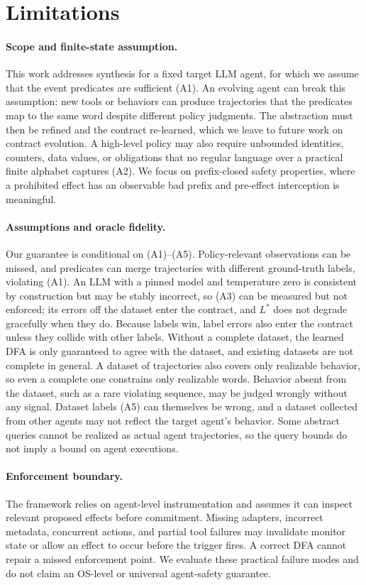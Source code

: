 \section{Limitations}\label{sec:limitations}
\paragraph{Scope and finite-state assumption.}
This work addresses synthesis for a fixed target LLM agent, for which we assume that the event predicates are sufficient (A1). An evolving agent can break this assumption: new tools or behaviors can produce trajectories that the predicates map to the same word despite different policy judgments. The abstraction must then be refined and the contract re-learned, which we leave to future work on contract evolution. A high-level policy may also require unbounded identities, counters, data values, or obligations that no regular language over a practical finite alphabet captures (A2). We focus on prefix-closed safety properties, where a prohibited effect has an observable bad prefix and pre-effect interception is meaningful.

\paragraph{Assumptions and oracle fidelity.}
Our guarantee is conditional on (A1)--(A5). Policy-relevant observations can be missed, and predicates can merge trajectories with different ground-truth labels, violating (A1). An LLM with a pinned model and temperature zero is consistent by construction but may be stably incorrect, so (A3) can be measured but not enforced; its errors off the dataset enter the contract, and $L^*$ does not degrade gracefully when they do. Because labels win, label errors also enter the contract unless they collide with other labels. Without a complete dataset, the learned DFA is only guaranteed to agree with the dataset, and existing datasets are not complete in general. A dataset of trajectories also covers only realizable behavior, so even a complete one constrains only realizable words. Behavior absent from the dataset, such as a rare violating sequence, may be judged wrongly without any signal. Dataset labels (A5) can themselves be wrong, and a dataset collected from other agents may not reflect the target agent's behavior. Some abstract queries cannot be realized as actual agent trajectories, so the query bounds do not imply a bound on agent executions.

\paragraph{Enforcement boundary.}
The framework relies on agent-level instrumentation and assumes it can inspect relevant proposed effects before commitment. Missing adapters, incorrect metadata, concurrent actions, and partial tool failures may invalidate monitor state or allow an effect to occur before the trigger fires. A correct DFA cannot repair a missed enforcement point. We evaluate these practical failure modes and do not claim an OS-level or universal agent-safety guarantee.
